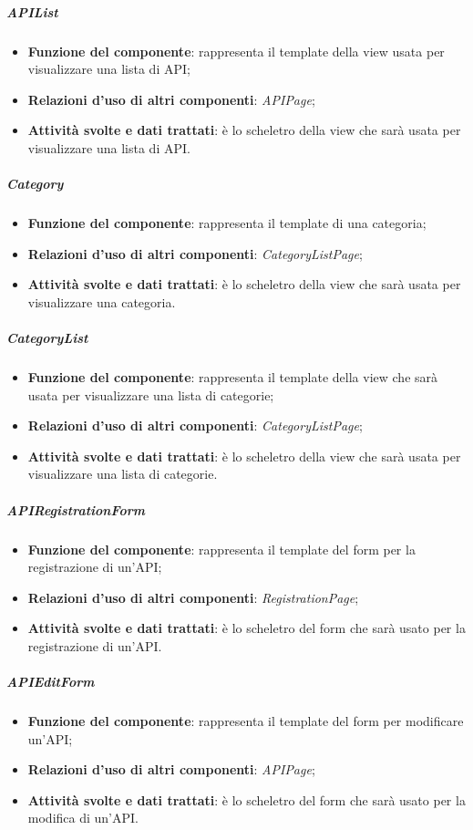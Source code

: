 \subparagraph{APIList}
\begin{itemize}
	\item \textbf{Funzione del componente}: rappresenta il template della view usata per visualizzare una lista di API;
	\item \textbf{Relazioni d’uso di altri componenti}: \textit{APIPage};
	\item \textbf{Attività svolte e dati trattati}: è lo scheletro della view che sarà usata per visualizzare una lista di API.
\end{itemize}

\subparagraph{Category}
\begin{itemize}
	\item \textbf{Funzione del componente}: rappresenta il template di una categoria;
	\item \textbf{Relazioni d’uso di altri componenti}: \textit{CategoryListPage};
	\item \textbf{Attività svolte e dati trattati}: \`{e} lo scheletro della view che sar\`{a} usata per visualizzare una categoria.
\end{itemize}

\subparagraph{CategoryList}
\begin{itemize}
	\item \textbf{Funzione del componente}: rappresenta il template della view che sar\`{a} usata per visualizzare una lista di categorie;
	\item \textbf{Relazioni d’uso di altri componenti}: \textit{CategoryListPage};
	\item \textbf{Attività svolte e dati trattati}: \`{e} lo scheletro della view che sar\`{a} usata per visualizzare una lista di categorie.
\end{itemize}

\subparagraph{APIRegistrationForm}
\begin{itemize}
	\item \textbf{Funzione del componente}: rappresenta il template del form per la registrazione di un'API;
	\item \textbf{Relazioni d’uso di altri componenti}: \textit{RegistrationPage};
	\item \textbf{Attività svolte e dati trattati}: \`{e} lo scheletro del form che sar\`{a} usato per la registrazione di un'API.
\end{itemize}

\subparagraph{APIEditForm}
\begin{itemize}
	\item \textbf{Funzione del componente}: rappresenta il template del form per modificare un'API;
	\item \textbf{Relazioni d’uso di altri componenti}: \textit{APIPage};
	\item \textbf{Attività svolte e dati trattati}: \`{e} lo scheletro del form che sar\`{a} usato per la modifica di un'API.
\end{itemize}

